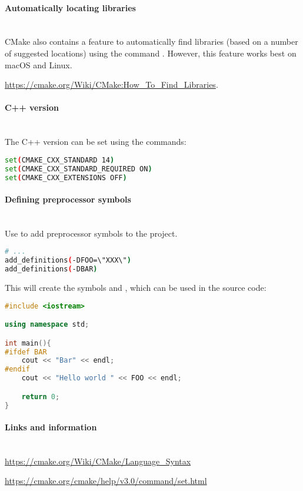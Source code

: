 \documentclass[11pt,a4paper,landscape]{scrartcl} %
\newcommand{\sectiontitle}[1]{\paragraph{#1} \ \\} %
\begin{document}
\begin{multicols}{2}


\sectiontitle{Automatically locating libraries}

CMake also contains a feature to automatically find libraries (based on a number of suggested locations) using the command . However, this feature works best on macOS and Linux. 

\url{https://cmake.org/Wiki/CMake:How_To_Find_Libraries}.

\sectiontitle{C++ version}

The C++ version can be set using the commands:

\begin{lstlisting}[language=bash]
set(CMAKE_CXX_STANDARD 14)
set(CMAKE_CXX_STANDARD_REQUIRED ON)
set(CMAKE_CXX_EXTENSIONS OFF)
\end{lstlisting}

\sectiontitle{Defining preprocessor symbols}

Use  to add preprocessor symbols to the project.

\begin{lstlisting}[language=bash]
# ...
add_definitions(-DFOO=\"XXX\")
add_definitions(-DBAR)
\end{lstlisting}

This will create the symbols  and , which can be used in the source code:

\begin{lstlisting}[language=c++]
#include <iostream>

using namespace std;

int main(){
#ifdef BAR
    cout << "Bar" << endl;
#endif
    cout << "Hello world " << FOO << endl;

    return 0;
}
\end{lstlisting}

\vspace{\baselineskip} %


\sectiontitle{Links and information}

\url{https://cmake.org/Wiki/CMake/Language_Syntax}

\url{https://cmake.org/cmake/help/v3.0/command/set.html}


\end{multicols}
\end{document}
